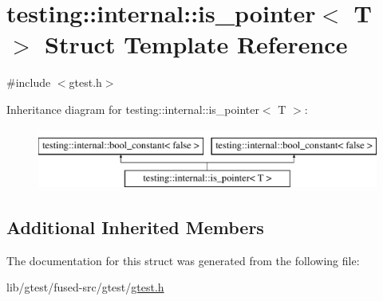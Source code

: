 \hypertarget{structtesting_1_1internal_1_1is__pointer}{\section{testing\-:\-:internal\-:\-:is\-\_\-pointer$<$ T $>$ Struct Template Reference}
\label{structtesting_1_1internal_1_1is__pointer}
}


{\ttfamily \#include $<$gtest.\-h$>$}

Inheritance diagram for testing\-:\-:internal\-:\-:is\-\_\-pointer$<$ T $>$\-:\begin{figure}[H]
\begin{center}
\leavevmode
\includegraphics[height=2.000000cm]{structtesting_1_1internal_1_1is__pointer}
\end{center}
\end{figure}
\subsection*{Additional Inherited Members}


The documentation for this struct was generated from the following file\-:\begin{DoxyCompactItemize}
\item 
lib/gtest/fused-\/src/gtest/\hyperlink{fused-src_2gtest_2gtest_8h}{gtest.\-h}\end{DoxyCompactItemize}
